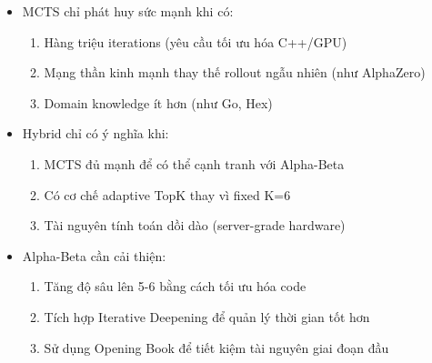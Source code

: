 \begin{itemize}
    \item MCTS chỉ phát huy sức mạnh khi có:
    \begin{enumerate}
        \item Hàng triệu iterations (yêu cầu tối ưu hóa C++/GPU)
        \item Mạng thần kinh mạnh thay thế rollout ngẫu nhiên (như AlphaZero)
        \item Domain knowledge ít hơn (như Go, Hex)
    \end{enumerate}
    
    \item Hybrid chỉ có ý nghĩa khi:
    \begin{enumerate}
        \item MCTS đủ mạnh để có thể cạnh tranh với Alpha-Beta
        \item Có cơ chế adaptive TopK thay vì fixed K=6
        \item Tài nguyên tính toán dồi dào (server-grade hardware)
    \end{enumerate}
    
    \item Alpha-Beta cần cải thiện:
    \begin{enumerate}
        \item Tăng độ sâu lên 5-6 bằng cách tối ưu hóa code
        \item Tích hợp Iterative Deepening để quản lý thời gian tốt hơn
        \item Sử dụng Opening Book để tiết kiệm tài nguyên giai đoạn đầu
    \end{enumerate}
\end{itemize}
